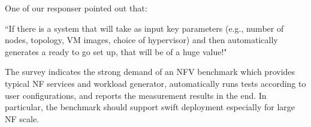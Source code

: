 One of our responser pointed out that:

``If there is a system that will take as input key parameters (e.g., number of nodes, topology, VM images, choice of hypervisor) and then automatically generates a ready to go set up, that will be of a huge value!"

The survey indicates the strong demand of an NFV benchmark
which provides typical NF services and workload generator,
automatically runs tests according to user configurations,
and reports the measurement results in the end.
In particular, the benchmark should support swift deployment 
especially for large NF scale.


